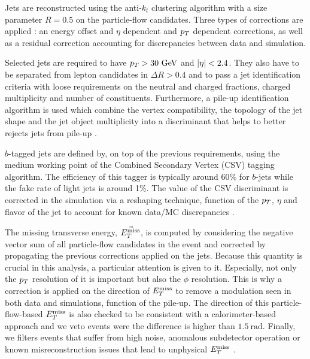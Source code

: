        Jets are reconstructed using the anti-$k_t$ clustering algorithm with a size 
       parameter $R = 0.5$ on the particle-flow candidates. Three types of corrections 
       are applied : an energy offset and $\eta$ dependent and $p_T$ dependent corrections, 
       as well as a residual correction accounting for discrepancies between data and simulation.

       Selected jets are required to have $p_T > 30 ~\text{GeV}$ and $\left| \eta \right| < 2.4$. They also 
       have to be separated from lepton candidates in $\Delta R > 0.4$ and to pass a jet 
       identification criteria with loose requirements on the neutral and 
       charged fractions, charged multiplicity and number of constituents. Furthermore,
       a pile-up identification algorithm is used which combine the vertex compatibility, 
       the topology of the jet shape and the jet object multiplicity into a discriminant 
       that helps to better rejects jets from pile-up .

       $b$-tagged jets are defined by, on top of the previous requirements, using the 
       medium working point of the Combined Secondary Vertex (CSV) tagging algorithm. 
       The efficiency of this tagger is typically around 60\% for $b$-jets while the fake 
       rate of light jets is around 1\%. The value of the CSV discriminant is corrected in 
       the simulation via a reshaping technique, function of the $p_T$, $\eta$ and flavor
       of the jet to account for known data/MC discrepancies .

       The missing transverse energy, $\vec{E_T^\text{miss}}$, is computed by considering the 
       negative vector sum of all particle-flow candidates in the event and corrected by
       propagating the previous corrections applied on the jets. Because this quantity is
       crucial in this analysis, a particular attention is given to it. Especially, not only
       the $p_T$ resolution of it is important but also the $\phi$ resolution. This is why
       a correction is applied on the direction of $E_T^\text{miss}$ to remove a modulation seen in 
       both data and simulations, function of the pile-up. The direction of this 
       particle-flow-based $E_T^\text{miss}$ is also checked to be consistent with a calorimeter-based
       approach and we veto events were the difference is higher than $1.5~\text{rad}$.
       Finally, we filters events that suffer from high noise, anomalous subdetector operation
       or known misreconstruction issues that lead to unphysical $E_T^\text{miss}$ \cite{METperf}.


